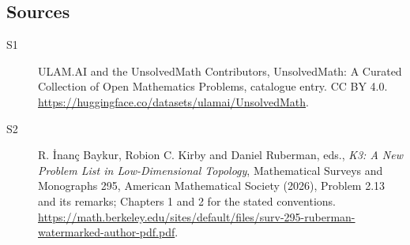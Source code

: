 \documentclass[11pt]{article}
\begin{document}
\subsection{Sources}
\begin{description}
\item[\hypertarget{source:statement:1}{S1}] ULAM.AI and the UnsolvedMath Contributors, UnsolvedMath: A Curated Collection of Open Mathematics Problems, catalogue entry. CC BY 4.0. \url{https://huggingface.co/datasets/ulamai/UnsolvedMath}.
\item[\hypertarget{source:statement:2}{S2}] R. İnanç Baykur, Robion C. Kirby and Daniel Ruberman, eds., \emph{K3: A New Problem List in Low-Dimensional Topology}, Mathematical Surveys and Monographs 295, American Mathematical Society (2026), Problem 2.13 and its remarks; Chapters 1 and 2 for the stated conventions. \url{https://math.berkeley.edu/sites/default/files/surv-295-ruberman-watermarked-author-pdf.pdf}.
\end{description}
\label{end:statement}
\end{document}
